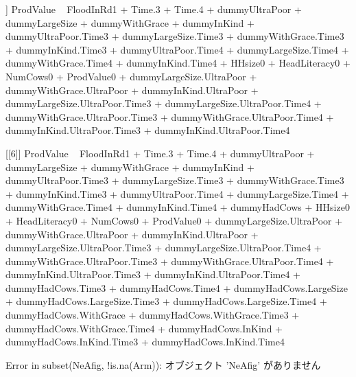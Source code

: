 \begin{Schunk}
\begin{Soutput}
[[5]]
ProdValue ~ FloodInRd1 + Time.3 + Time.4 + dummyUltraPoor + dummyLargeSize + 
    dummyWithGrace + dummyInKind + dummyUltraPoor.Time3 + dummyLargeSize.Time3 + 
    dummyWithGrace.Time3 + dummyInKind.Time3 + dummyUltraPoor.Time4 + 
    dummyLargeSize.Time4 + dummyWithGrace.Time4 + dummyInKind.Time4 + 
    HHsize0 + HeadLiteracy0 + NumCows0 + ProdValue0 + dummyLargeSize.UltraPoor + 
    dummyWithGrace.UltraPoor + dummyInKind.UltraPoor + dummyLargeSize.UltraPoor.Time3 + 
    dummyLargeSize.UltraPoor.Time4 + dummyWithGrace.UltraPoor.Time3 + 
    dummyWithGrace.UltraPoor.Time4 + dummyInKind.UltraPoor.Time3 + 
    dummyInKind.UltraPoor.Time4

[[6]]
ProdValue ~ FloodInRd1 + Time.3 + Time.4 + dummyUltraPoor + dummyLargeSize + 
    dummyWithGrace + dummyInKind + dummyUltraPoor.Time3 + dummyLargeSize.Time3 + 
    dummyWithGrace.Time3 + dummyInKind.Time3 + dummyUltraPoor.Time4 + 
    dummyLargeSize.Time4 + dummyWithGrace.Time4 + dummyInKind.Time4 + 
    dummyHadCows + HHsize0 + HeadLiteracy0 + NumCows0 + ProdValue0 + 
    dummyLargeSize.UltraPoor + dummyWithGrace.UltraPoor + dummyInKind.UltraPoor + 
    dummyLargeSize.UltraPoor.Time3 + dummyLargeSize.UltraPoor.Time4 + 
    dummyWithGrace.UltraPoor.Time3 + dummyWithGrace.UltraPoor.Time4 + 
    dummyInKind.UltraPoor.Time3 + dummyInKind.UltraPoor.Time4 + 
    dummyHadCows.Time3 + dummyHadCows.Time4 + dummyHadCows.LargeSize + 
    dummyHadCows.LargeSize.Time3 + dummyHadCows.LargeSize.Time4 + 
    dummyHadCows.WithGrace + dummyHadCows.WithGrace.Time3 + dummyHadCows.WithGrace.Time4 + 
    dummyHadCows.InKind + dummyHadCows.InKind.Time3 + dummyHadCows.InKind.Time4
\end{Soutput}
\end{Schunk}
\begin{Schunk}
\begin{Soutput}
Error in subset(NeAfig, !is.na(Arm)):  オブジェクト 'NeAfig' がありません 
\end{Soutput}
\end{Schunk}



